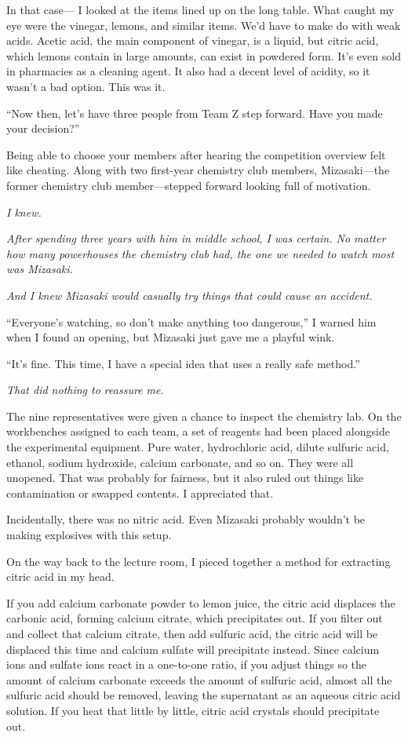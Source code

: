 \documentclass[
    a4paper,
    12pt,
    twoside,
    openany,
    UTF8,
    fontset=windows
]{ctexbook}
\begin{document}
In that case--- I looked at the items lined up on the long table. What caught my eye were the vinegar, lemons, and similar items. We'd have to make do with weak acids. Acetic acid, the main component of vinegar, is a liquid, but citric acid, which lemons contain in large amounts, can exist in powdered form. It's even sold in pharmacies as a cleaning agent. It also had a decent level of acidity, so it wasn't a bad option. This was it.

``Now then, let's have three people from Team Z step forward. Have you made your decision?''

Being able to choose your members after hearing the competition overview felt like cheating. Along with two first-year chemistry club members, Mizasaki---the former chemistry club member---stepped forward looking full of motivation.

\textit{I knew.}

\textit{After spending three years with him in middle school, I was certain. No matter how many powerhouses the chemistry club had, the one we needed to watch most was Mizasaki.}

\textit{And I knew Mizasaki would casually try things that could cause an accident.}

``Everyone's watching, so don't make anything too dangerous,'' I warned him when I found an opening, but Mizasaki just gave me a playful wink.

``It's fine. This time, I have a special idea that uses a really safe method.''

\textit{That did nothing to reassure me.}

The nine representatives were given a chance to inspect the chemistry lab. On the workbenches assigned to each team, a set of reagents had been placed alongside the experimental equipment. Pure water, hydrochloric acid, dilute sulfuric acid, ethanol, sodium hydroxide, calcium carbonate, and so on. They were all unopened. That was probably for fairness, but it also ruled out things like contamination or swapped contents. I appreciated that.

Incidentally, there was no nitric acid. Even Mizasaki probably wouldn't be making explosives with this setup.

On the way back to the lecture room, I pieced together a method for extracting citric acid in my head.

If you add calcium carbonate powder to lemon juice, the citric acid displaces the carbonic acid, forming calcium citrate, which precipitates out. If you filter out and collect that calcium citrate, then add sulfuric acid, the citric acid will be displaced this time and calcium sulfate will precipitate instead. Since calcium ions and sulfate ions react in a one-to-one ratio, if you adjust things so the amount of calcium carbonate exceeds the amount of sulfuric acid, almost all the sulfuric acid should be removed, leaving the supernatant as an aqueous citric acid solution. If you heat that little by little, citric acid crystals should precipitate out.
\end{document}
